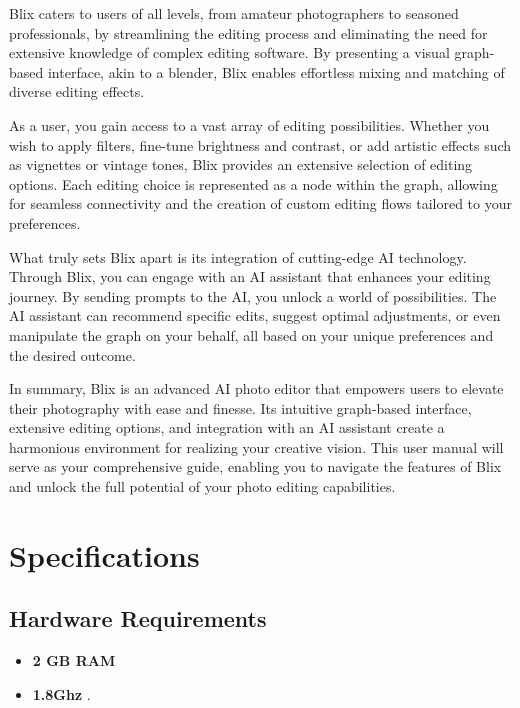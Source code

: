\documentclass[11pt,a4paper]{article}
\begin{document}
Blix caters to users of all levels, from amateur photographers to seasoned professionals, by streamlining the editing process and eliminating the need 
for extensive knowledge of complex editing software. By presenting a visual graph-based interface, akin to a blender, Blix enables effortless mixing and matching of diverse editing effects.

As a user, you gain access to a vast array of editing possibilities. Whether you wish to apply filters, fine-tune brightness and contrast, or add artistic effects such as vignettes or vintage tones, Blix provides an extensive selection of editing options. Each editing choice is represented as a node within the graph, allowing for seamless connectivity and the creation of custom editing flows tailored to your preferences.

What truly sets Blix apart is its integration of cutting-edge AI technology. Through Blix, you can engage with an AI assistant that enhances your editing journey. 
By sending prompts to the AI, you unlock a world of possibilities. The AI assistant can recommend specific edits, suggest optimal adjustments, or even manipulate the graph on your behalf, 
all based on your unique preferences and the desired outcome.

In summary, Blix is an advanced AI photo editor that empowers users to elevate their photography with ease and finesse. Its intuitive graph-based interface, extensive editing options, 
and integration with an AI assistant create a harmonious environment for realizing your creative vision. This user manual will serve as your comprehensive guide, enabling you 
to navigate the features of Blix and unlock the full potential of your photo editing capabilities.
\pagebreak


\section*{Specifications}

\subsection*{Hardware Requirements}
\begin{itemize}
  \item[\textbullet] \textbf{2 GB RAM}
  \item[\textbullet] \textbf{1.8Ghz }.

\end{itemize}
\end{document}
